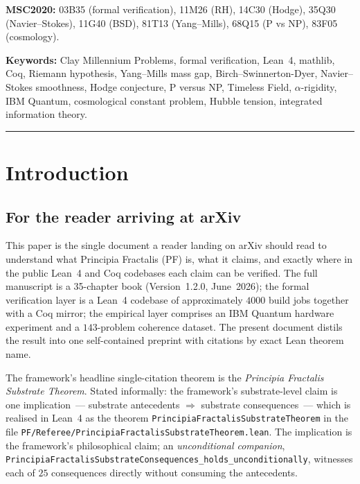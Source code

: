 \documentclass[11pt,a4paper]{article}
\theoremstyle{definition}
\theoremstyle{remark}
\newcommand{\lean}[1]{\texttt{\small #1}}
\begin{document}
\noindent\textbf{MSC2020:} 03B35 (formal verification), 11M26 (RH),
14C30 (Hodge), 35Q30 (Navier--Stokes), 11G40 (BSD),
81T13 (Yang--Mills), 68Q15 (P vs NP), 83F05 (cosmology).

\medskip
\noindent\textbf{Keywords:} Clay Millennium Problems, formal
verification, Lean~4, mathlib, Coq, Riemann hypothesis,
Yang--Mills mass gap, Birch--Swinnerton-Dyer, Navier--Stokes
smoothness, Hodge conjecture, P versus NP, Timeless Field,
$\alpha$-rigidity, IBM Quantum, cosmological constant problem,
Hubble tension, integrated information theory.

\bigskip
\hrule
\bigskip

\tableofcontents
\newpage

\section{Introduction}
\label{sec:intro}

\subsection{For the reader arriving at arXiv}

This paper is the single document a reader landing on arXiv should
read to understand what Principia Fractalis (PF) is, what it
claims, and exactly where in the public Lean~4 and Coq codebases
each claim can be verified. The full manuscript is a 35-chapter
book (Version~1.2.0, June~2026); the formal verification layer is
a Lean~4 codebase of approximately $4000$ build jobs together with
a Coq mirror; the empirical layer comprises an
IBM Quantum hardware experiment and a $143$-problem coherence
dataset. The present document distils the result into one
self-contained preprint with citations by exact Lean theorem name.

The framework's headline single-citation theorem is the
\emph{Principia Fractalis Substrate Theorem}. Stated informally:
the framework's substrate-level claim is one
implication~--- substrate antecedents
$\Rightarrow$ substrate consequences~--- which is realised in
Lean~4 as the theorem
\lean{PrincipiaFractalisSubstrateTheorem} in the file
\lean{PF/Referee/PrincipiaFractalisSubstrateTheorem.lean}. The
implication is the framework's philosophical claim; an
\emph{unconditional companion},
\lean{PrincipiaFractalisSubstrateConsequences\_holds\_unconditionally},
witnesses each of $25$ consequences directly without consuming the
antecedents.
\end{document}
